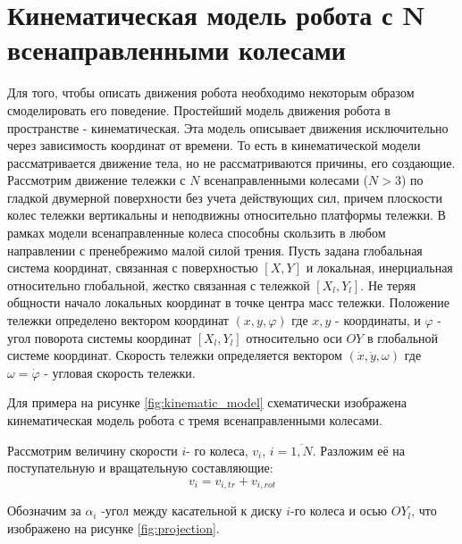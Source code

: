 \documentclass[oneside,final,14pt]{extreport}
\begin{document}
\chapter{Кинематическая модель робота с N всенаправленными колесами}   
Для того, чтобы описать движения робота необходимо некоторым образом смоделировать его поведение. Простейший модель движения робота в пространстве - кинематическая. Эта модель описывает движения исключительно через зависимость координат от времени. То есть в кинематической модели рассматривается движение тела, но не рассматриваются причины, его создающие.
Рассмотрим движение тележки с $N$ всенаправленными колесами ($N > 3$) по гладкой двумерной поверхности без учета действующих сил, причем плоскости колес тележки вертикальны и неподвижны относительно платформы тележки. В рамках модели всенаправленные колеса способны скользить в любом направлении с пренебрежимо малой силой трения. Пусть задана глобальная система координат, связанная с поверхностью $[X,Y]$ и локальная,  инерциальная относительно глобальной, жестко связанная с тележкой $[X_{l},Y_{l}]$. Не теряя общности начало локальных координат в точке центра масс тележки. Положение тележки определено вектором координат $(x,y,\varphi)$
где $x,y$ - координаты, и $\varphi$ -  угол поворота системы координат $[X_{l},Y_{l}]$ относительно оси $OY$ в глобальной системе координат. Скорость тележки определяется вектором $(\dot{x},\dot{y},\omega)$ где $\omega = \dot{\varphi}$ - угловая скорость тележки.

Для примера на рисунке \ref{fig:kinematic_model} схематически изображена кинематическая модель робота с тремя всенаправленными колесами.
\begin{figure}[H]
\end{figure}

Рассмотрим величину скорости $i$- го колеса, $v_{i}$, $i = \overline{1,N}$. Разложим её на поступательную и  вращательную составляющие:
\begin{equation}
v_{i}
=
v_{i,tr} + v_{i,rot}
\end{equation}

Обозначим за $\alpha_{i}$ -угол между касательной к диску $i$-го колеса и осью $OY_{l}$, что изображено на рисунке 
\ref{fig:projection}. 
\begin{figure}[H]
\end{figure} 
\end{document}
